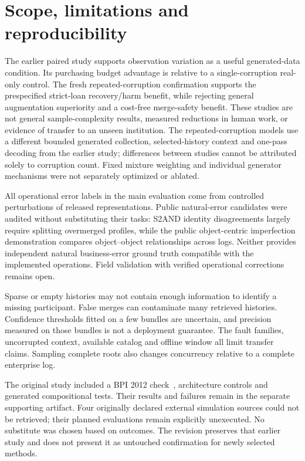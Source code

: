 \documentclass[11pt]{article}
\begin{document}
\section{Scope, limitations and reproducibility}
The earlier paired study supports observation variation as a useful generated-data condition. Its purchasing budget advantage is relative to a single-corruption real-only control. The fresh repeated-corruption confirmation supports the prespecified strict-loan recovery/harm benefit, while rejecting general augmentation superiority and a cost-free merge-safety benefit. These studies are not general sample-complexity results, measured reductions in human work, or evidence of transfer to an unseen institution. The repeated-corruption models use a different bounded generated collection, selected-history context and one-pass decoding from the earlier study; differences between studies cannot be attributed solely to corruption count. Fixed mixture weighting and individual generator mechanisms were not separately optimized or ablated.

All operational error labels in the main evaluation come from controlled perturbations of released representations. Public natural-error candidates were audited without substituting their tasks: S2AND identity disagreements largely require splitting overmerged profiles, while the public object-centric imperfection demonstration compares object--object relationships across logs. Neither provides independent natural business-error ground truth compatible with the implemented operations. Field validation with verified operational corrections remains open.

Sparse or empty histories may not contain enough information to identify a missing participant. False merges can contaminate many retrieved histories. Confidence thresholds fitted on a few bundles are uncertain, and precision measured on those bundles is not a deployment guarantee. The fault families, uncorrupted context, available catalog and offline window all limit transfer claims. Sampling complete roots also changes concurrency relative to a complete enterprise log.

The original study included a BPI 2012 check~\cite{bpi2012}, architecture controls and generated compositional tests. Their results and failures remain in the separate supporting artifact. Four originally declared external simulation sources could not be retrieved; their planned evaluations remain explicitly unexecuted. No substitute was chosen based on outcomes. The revision preserves that earlier study and does not present it as untouched confirmation for newly selected methods.
\end{document}

